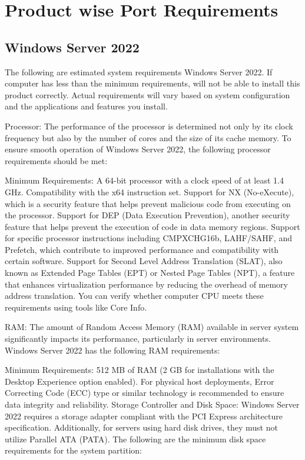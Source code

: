 \chapter{Product wise Port Requirements}
\section{Windows Server 2022}
The following are estimated system requirements Windows Server 2022. If computer has less than the minimum requirements, will not be able to install this product correctly. Actual requirements will vary based on system configuration and the applications and features you install.

Processor:
The performance of the processor is determined not only by its clock frequency but also by the number of cores and the size of its cache memory. To ensure smooth operation of Windows Server 2022, the following processor requirements should be met:

Minimum Requirements:
A 64-bit processor with a clock speed of at least 1.4 GHz.
Compatibility with the x64 instruction set.
Support for NX (No-eXecute), which is a security feature that helps prevent malicious code from executing on the processor.
Support for DEP (Data Execution Prevention), another security feature that helps prevent the execution of code in data memory regions.
Support for specific processor instructions including CMPXCHG16b, LAHF/SAHF, and Prefetch, which contribute to improved performance and compatibility with certain software.
Support for Second Level Address Translation (SLAT), also known as Extended Page Tables (EPT) or Nested Page Tables (NPT), a feature that enhances virtualization performance by reducing the overhead of memory address translation.
You can verify whether computer CPU meets these requirements using tools like Core Info.




RAM:
The amount of Random Access Memory (RAM) available in server system significantly impacts its performance, particularly in server environments. Windows Server 2022 has the following RAM requirements:

Minimum Requirements:
512 MB of RAM (2 GB for installations with the Desktop Experience option enabled).
For physical host deployments, Error Correcting Code (ECC) type or similar technology is recommended to ensure data integrity and reliability.
Storage Controller and Disk Space:
Windows Server 2022 requires a storage adapter compliant with the PCI Express architecture specification. Additionally, for servers using hard disk drives, they must not utilize Parallel ATA (PATA). The following are the minimum disk space requirements for the system partition:

